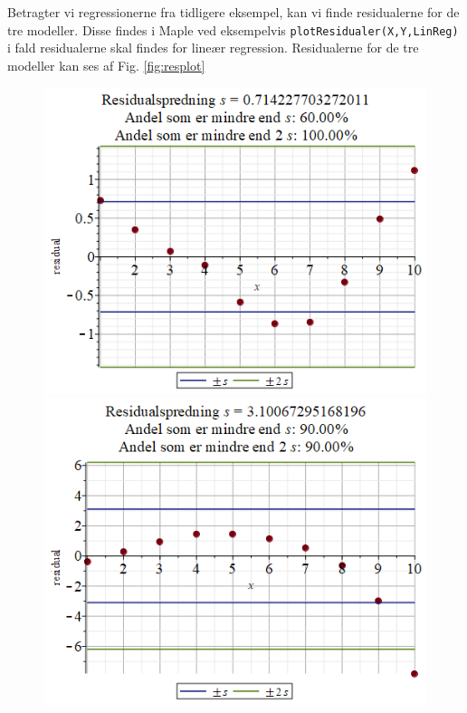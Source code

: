 \begin{exa}
Betragter vi regressionerne fra tidligere eksempel, kan vi finde residualerne for de tre modeller. Disse findes i Maple ved eksempelvis \texttt{plotResidualer(X,Y,LinReg)} i fald residualerne skal findes for lineær regression. Residualerne for de tre modeller kan ses af Fig. \ref{fig:resplot}
\begin{figure}[H]
\centering
\includegraphics[width = \textwidth*4/10]{Billeder/residuallin.png}
\includegraphics[width = \textwidth*4/10]{Billeder/residualexp.png}

\end{figure}
\end{exa}

